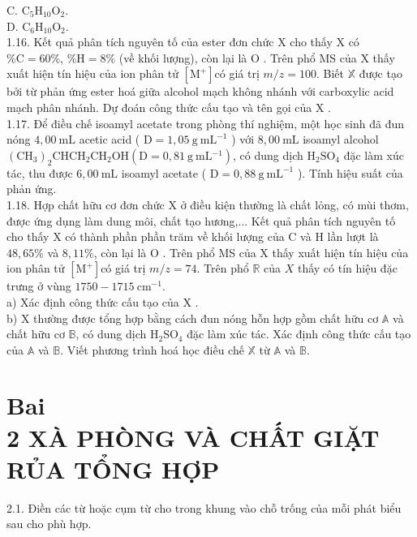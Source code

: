 \documentclass[10pt]{article}
\begin{document}
C. $\mathrm{C}_{5} \mathrm{H}_{10} \mathrm{O}_{2}$.\\
D. $\mathrm{C}_{6} \mathrm{H}_{10} \mathrm{O}_{2}$.\\
1.16. Kết quả phân tích nguyên tố của ester đơn chức X cho thấy X có $\% \mathrm{C}=60 \%$, $\% \mathrm{H}=8 \%$ (về khối lượng), còn lại là O . Trên phổ MS của X thấy xuất hiện tín hiệu của ion phân tử $\left[\mathrm{M}^{+}\right]$có giá trị $m / z=100$. Biết $\mathbb{X}$ được tạo bởi từ phản ứng ester hoá giữa alcohol mạch không nhánh với carboxylic acid mạch phân nhánh. Dự đoán công thức cấu tạo và tên gọi của X .\\
1.17. Để điều chế isoamyl acetate trong phòng thí nghiệm, một học sinh đã đun nóng $4,00 \mathrm{~mL}$ acetic acid ( $\mathrm{D}=1,05 \mathrm{~g} \mathrm{~mL}^{-1}$ ) với $8,00 \mathrm{~mL}$ isoamyl alcohol $\left(\mathrm{CH}_{3}\right)_{2} \mathrm{CHCH}_{2} \mathrm{CH}_{2} \mathrm{OH}\left(\mathrm{D}=0,81 \mathrm{~g} \mathrm{~mL}{ }^{-1}\right)$, có dung dịch $\mathrm{H}_{2} \mathrm{SO}_{4}$ đặc làm xúc tác, thu được $6,00 \mathrm{~mL}$ isoamyl acetate ( $\mathrm{D}=0,88 \mathrm{~g} \mathrm{~mL}^{-1}$ ). Tính hiệu suất của phản ứng.\\
1.18. Hợp chất hữu cơ đơn chức X ở điều kiện thường là chất lỏng, có mùi thơm, được ứng dụng làm dung môi, chất tạo hương,... Kết quả phân tích nguyên tố cho thấy X có thành phần phần trăm về khối lượng của C và H lần lượt là $48,65 \%$ và $8,11 \%$, còn lại là O . Trên phổ MS của X thấy xuất hiện tín hiệu của ion phân tử $\left[\mathrm{M}^{+}\right]$có giá trị $m / z=74$. Trên phổ $\mathbb{R}$ của $X$ thấy có tín hiệu đặc trưng ở vùng $1750-1715 \mathrm{~cm}^{-1}$.\\
a) Xác định công thức cấu tạo của X .\\
b) X thường được tổng hợp bằng cách đun nóng hỗn hợp gồm chất hữu cơ $\mathbb{A}$ và chất hữu cơ $\mathbb{B}$, có dung dịch $\mathrm{H}_{2} \mathrm{SO}_{4}$ đặc làm xúc tác. Xác định công thức cấu tạo của $\mathbb{A}$ và $\mathbb{B}$. Viết phương trình hoá học điều chế $\mathbb{X}$ từ $\mathbb{A}$ và $\mathbb{B}$.

\section*{Bai \\
 2 XÀ PHÒNG VÀ CHẤT GIẶT RỦA TỔNG HỢP}
2.1. Điền các từ hoặc cụm từ cho trong khung vào chỗ trống của mỗi phát biểu sau cho phù hợp.
\end{document}
